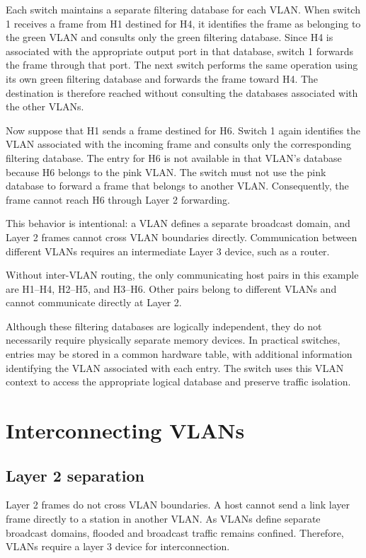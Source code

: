 Each switch maintains a separate filtering database for each VLAN. When switch 1 receives a frame from H1 destined for H4, it identifies the frame as belonging to the green VLAN and consults only the green filtering database. Since H4 is associated with the appropriate output port in that database, switch 1 forwards the frame through that port. The next switch performs the same operation using its own green filtering database and forwards the frame toward H4. The destination is therefore reached without consulting the databases associated with the other VLANs.

Now suppose that H1 sends a frame destined for H6. Switch 1 again identifies the VLAN associated with the incoming frame and consults only the corresponding filtering database. The entry for H6 is not available in that VLAN's database because H6 belongs to the pink VLAN. The switch must not use the pink database to forward a frame that belongs to another VLAN. Consequently, the frame cannot reach H6 through Layer 2 forwarding.

This behavior is intentional: a VLAN defines a separate broadcast domain, and Layer 2 frames cannot cross VLAN boundaries directly. Communication between different VLANs requires an intermediate Layer 3 device, such as a router.

Without inter-VLAN routing, the only communicating host pairs in this example are H1–H4, H2–H5, and H3–H6. Other pairs belong to different VLANs and cannot communicate directly at Layer 2.

Although these filtering databases are logically independent, they do not necessarily require physically separate memory devices. In practical switches, entries may be stored in a common hardware table, with additional information identifying the VLAN associated with each entry. The switch uses this VLAN context to access the appropriate logical database and preserve traffic isolation.

\section{Interconnecting VLANs}

\subsection{Layer 2 separation}

Layer 2 frames do not cross VLAN boundaries. A host cannot send a link layer frame directly to a station in another VLAN. As VLANs define separate broadcast domains, flooded and broadcast traffic remains confined. Therefore, VLANs require a layer 3 device for interconnection.


